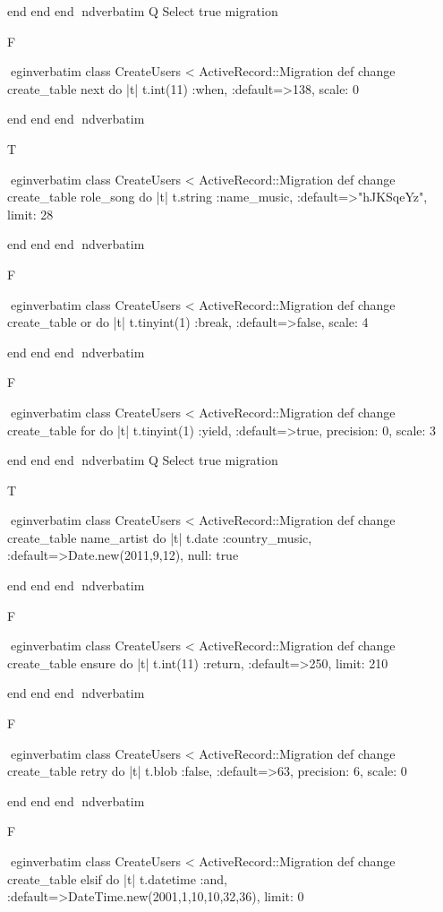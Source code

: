     end 
  end 
end
nd{verbatim}
Q
 Select true migration

F

egin{verbatim}
 class CreateUsers < ActiveRecord::Migration 
  def change 
    create_table next do |t| 
      t.int(11) :when, :default=>138, scale: 0
    
    end 
  end 
end
nd{verbatim}

T

egin{verbatim}
 class CreateUsers < ActiveRecord::Migration 
  def change 
    create_table role_song do |t| 
      t.string :name_music, :default=>"hJKSqeYz", limit: 28
    
    end 
  end 
end
nd{verbatim}

F

egin{verbatim}
 class CreateUsers < ActiveRecord::Migration 
  def change 
    create_table or do |t| 
      t.tinyint(1) :break, :default=>false, scale: 4
    
    end 
  end 
end
nd{verbatim}

F

egin{verbatim}
 class CreateUsers < ActiveRecord::Migration 
  def change 
    create_table for do |t| 
      t.tinyint(1) :yield, :default=>true, precision: 0, scale: 3
    
    end 
  end 
end
nd{verbatim}
Q
 Select true migration

T

egin{verbatim}
 class CreateUsers < ActiveRecord::Migration 
  def change 
    create_table name_artist do |t| 
      t.date :country_music, :default=>Date.new(2011,9,12), null: true
    
    end 
  end 
end
nd{verbatim}

F

egin{verbatim}
 class CreateUsers < ActiveRecord::Migration 
  def change 
    create_table ensure do |t| 
      t.int(11) :return, :default=>250, limit: 210
    
    end 
  end 
end
nd{verbatim}

F

egin{verbatim}
 class CreateUsers < ActiveRecord::Migration 
  def change 
    create_table retry do |t| 
      t.blob :false, :default=>63, precision: 6, scale: 0
    
    end 
  end 
end
nd{verbatim}

F

egin{verbatim}
 class CreateUsers < ActiveRecord::Migration 
  def change 
    create_table elsif do |t| 
      t.datetime :and, :default=>DateTime.new(2001,1,10,10,32,36), limit: 0
    
